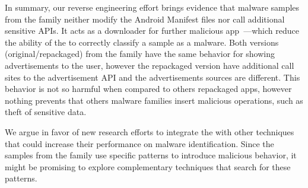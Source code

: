 In summary, our reverse engineering effort brings evidence that malware samples from the \gps family neither modify the Android Manifest files nor call additional sensitive APIs. It acts as a
downloader for further malicious app~\cite{DBLP:conf/ndss/ArpSHGR14}---which reduce the ability of the \mas to correctly classify a sample as a malware. Both versions (original/repackaged) from the \gps family have the same behavior for showing advertisements to the user,
however the repackaged version have additional call sites to the advertisement API and the advertisements sources are different. This behavior is not so harmful when compared to others repackaged apps, however nothing prevents that others malware families insert malicious operations, such as theft of
sensitive data.

\alert{We argue in favor of new research efforts to integrate the \mas 
with other techniques that could increase their performance
on malware identification. Since the samples from the \gps
family use specific patterns to introduce malicious behavior,
it might be promising to explore complementary techniques that
search for these patterns.}



 








